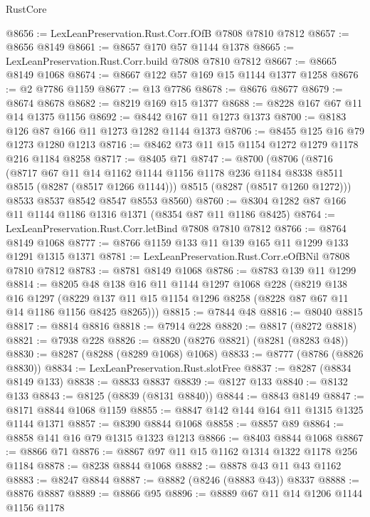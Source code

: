 \begin{lexlean}{RustCore}
\begin{coremodule}
@8656 := LexLeanPreservation.Rust.Corr.fOfB @7808 @7810 @7812
@8657 := @8656 @8149
@8661 := @8657 @170 @57 @1144 @1378
@8665 := LexLeanPreservation.Rust.Corr.build @7808 @7810 @7812
@8667 := @8665 @8149 @1068
@8674 := @8667 @122 @57 @169 @15 @1144 @1377 @1258
@8676 := @2 @7786 @1159
@8677 := @13 @7786
@8678 := @8676 @8677
@8679 := @8674 @8678
@8682 := @8219 @169 @15 @1377
@8688 := @8228 @167 @67 @11 @14 @1375 @1156
@8692 := @8442 @167 @11 @1273 @1373
@8700 := @8183 @126 @87 @166 @11 @1273 @1282 @1144 @1373
@8706 := @8455 @125 @16 @79 @1273 @1280 @1213
@8716 := @8462 @73 @11 @15 @1154 @1272 @1279 @1178 @216 @1184 @8258
@8717 := @8405 @71
@8747 := @8700
    (@8706
      (@8716
        (@8717
          @67
          @11
          @14
          @1162
          @1144
          @1156
          @1178
          @236
          @1184
          @8338
          @8511
          @8515
          (@8287 (@8517 @1266 @1144)))
        @8515
        (@8287 (@8517 @1260 @1272)))
      @8533
      @8537
      @8542
      @8547
      @8553
      @8560)
@8760 := @8304 @1282 @87 @166 @11 @1144 @1186 @1316 @1371 (@8354 @87 @11 @1186 @8425)
@8764 := LexLeanPreservation.Rust.Corr.letBind @7808 @7810 @7812
@8766 := @8764 @8149 @1068
@8777 := @8766 @1159 @133 @11 @139 @165 @11 @1299 @133 @1291 @1315 @1371
@8781 := LexLeanPreservation.Rust.Corr.eOfBNil @7808 @7810 @7812
@8783 := @8781 @8149 @1068
@8786 := @8783 @139 @11 @1299
@8814 := @8205
    @48
    @138
    @16
    @11
    @1144
    @1297
    @1068
    @228
    (@8219
      @138
      @16
      @1297
      (@8229 @137 @11 @15 @1154 @1296 @8258 (@8228 @87 @67 @11 @14 @1186 @1156 @8425 @8265)))
@8815 := @7844 @48
@8816 := @8040 @8815
@8817 := @8814 @8816
@8818 := @7914 @228
@8820 := @8817 (@8272 @8818)
@8821 := @7938 @228
@8826 := @8820 (@8276 @8821) (@8281 (@8283 @48))
@8830 := @8287 (@8288 (@8289 @1068) @1068)
@8833 := @8777 (@8786 (@8826 @8830))
@8834 := LexLeanPreservation.Rust.slotFree
@8837 := @8287 (@8834 @8149 @133)
@8838 := @8833 @8837
@8839 := @8127 @133
@8840 := @8132 @133
@8843 := @8125 (@8839 (@8131 @8840))
@8844 := @8843 @8149
@8847 := @8171 @8844 @1068 @1159
@8855 := @8847 @142 @144 @164 @11 @1315 @1325 @1144 @1371
@8857 := @8390 @8844 @1068
@8858 := @8857 @89
@8864 := @8858 @141 @16 @79 @1315 @1323 @1213
@8866 := @8403 @8844 @1068
@8867 := @8866 @71
@8876 := @8867 @97 @11 @15 @1162 @1314 @1322 @1178 @256 @1184
@8878 := @8238 @8844 @1068
@8882 := @8878 @43 @11 @43 @1162
@8883 := @8247 @8844
@8887 := @8882 (@8246 (@8883 @43)) @8337
@8888 := @8876 @8887
@8889 := @8866 @95
@8896 := @8889 @67 @11 @14 @1206 @1144 @1156 @1178

\end{coremodule}
\end{lexlean}
